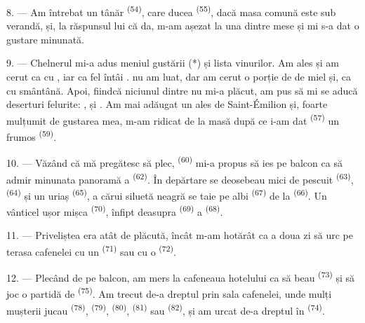 8. --- Am întrebat un tânăr  \textsuperscript{(54)}, care ducea
 \textsuperscript{(55)}, dacă masa comună este sub verandă,
și, la răspunsul lui că da, m-am așezat la una dintre mese și mi s-a dat o gustare
minunată.


\VUsaut{4.0mm}
\VUsaut{3.0mm}

9. --- Chelnerul mi-a adus meniul gustării (*) și lista vinurilor. Am ales și am
cerut ca  cu , iar ca fel întâi
.  nu am luat, dar am cerut o
porție de  de miel și, ca  cu smântână. Apoi,
fiindcă niciunul dintre  nu mi-a plăcut, am pus să mi se aducă
deserturi felurite: ,  și . Am mai
adăugat un  ales de Saint-Émilion și, foarte mulțumit de gustarea mea,
m-am ridicat de la masă după ce i-am dat 
\textsuperscript{(57)} un  frumos \textsuperscript{(59)}.

10. --- Văzând că mă pregătesc să plec,  \textsuperscript{(60)}
mi-a propus să ies pe balcon ca să admir minunata panoramă a 
\textsuperscript{(62)}. În depărtare se deosebeau  mici de pescuit
\textsuperscript{(63)},  \textsuperscript{(64)} și un
 uriaș \textsuperscript{(65)}, a cărui siluetă neagră se taie pe
 albi \textsuperscript{(67)} de la 
\textsuperscript{(66)}. Un vânticel ușor mișca 
\textsuperscript{(70)}, înfipt deasupra  \textsuperscript{(69)} a
 \textsuperscript{(68)}.

\VUsaut{3.0mm}
\VUsaut{3.0mm}

11. --- Priveliștea era atât de plăcută, încât m-am hotărât ca a doua zi să urc pe
terasa cafenelei cu un  \textsuperscript{(71)} sau cu o
 \textsuperscript{(72)}.

12. --- Plecând de pe balcon, am mers la cafeneaua hotelului ca să beau
 \textsuperscript{(73)} și să joc o partidă de 
\textsuperscript{(75)}. Am trecut de-a dreptul prin sala cafenelei, unde mulți
mușterii jucau  \textsuperscript{(78)}, 
\textsuperscript{(79)},  \textsuperscript{(80)},
 \textsuperscript{(81)} sau  \textsuperscript{(82)},
și am urcat de-a dreptul în  \textsuperscript{(74)}.

